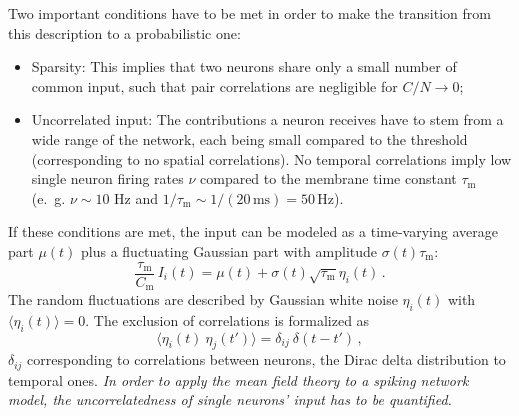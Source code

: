Two important conditions have to be met in order to make the transition from 
this description to a probabilistic one:
\begin{itemize}
    \item Sparsity: This implies that 
        two neurons share only a small number of common input, such that pair correlations
        are negligible for $C / N \to 0$; 
    \item Uncorrelated input: The contributions a neuron receives have to stem from 
        a wide range of the network, each being small compared to the threshold
        (corresponding to no spatial correlations). 
        No temporal correlations imply low single neuron firing rates $\nu$ compared 
        to the membrane time constant $\tau_\text{m}$
        (e.~g. $\nu \sim10$ Hz and $1 / \tau_\text{m} \sim 1 / (20\,\text{ms}) = 50\, \text{Hz}$).
\end{itemize}
If these conditions are met, the input can be modeled as a time-varying average part
$\mu(t)$ plus a fluctuating Gaussian part with amplitude $\sigma(t)\tau_\text{m}$:
\begin{equation}
    \frac{\tau_\text{m}}{C_\text{m}} \, I_i(t) =  \mu(t) + \sigma(t) \sqrt{\tau_\text{m}} \eta_i(t) \, .
    \label{eq:input_random}
\end{equation}
The random fluctuations are described by Gaussian white noise $\eta_i(t)$ with 
$\langle  \eta_i(t)\rangle = 0$. 
The exclusion of correlations is formalized as  
\begin{equation}
    \langle \eta_i(t) \: \eta_j(t') \rangle = \delta_{ij} \: \delta(t - t')	\, ,
    \label{eq:no_correlations}
\end{equation}
$\delta_{ij}$ corresponding to correlations between neurons, 
the Dirac delta distribution to temporal ones. 
\emph{
    In order to apply the mean field theory to a spiking network model, 
the uncorrelatedness of single neurons' input has to be quantified.}

